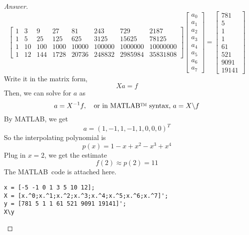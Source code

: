 \begin{proof}[Answer]
\[\begin{bmatrix}
1 &	3	&	9	&	27		&	81		&	243		&	729		&	2187	\\
1 &	5	&	25	&	125		&	625		&	3125	&	15625	&	78125	\\
1 &	10	&	100	&	1000	&	10000	&	100000	&	1000000	&	10000000\\
1 &	12	&	144	&	1728	&	20736	&	248832	&	2985984	&	35831808
\end{bmatrix}
\begin{bmatrix}
a_0 \\ a_1 \\ a_2 \\ a_3 \\ a_4 \\ a_5 \\ a_6 \\ a_7
\end{bmatrix}=
\begin{bmatrix}
781 \\ 5 \\ 1 \\ 1 \\ 61 \\ 521 \\ 9091 \\ 19141
\end{bmatrix}\]
Write it in the matrix form,
\[ Xa=f \]
Then, we can solve for $a$ as
\[ a=X^{-1}f, \quad \textrm{or in MATLAB\texttrademark\ syntax, } a=X\backslash f \]
By MATLAB\texttrademark, we get
\[ a=(1,-1,1,-1,1,0,0,0)^T \]
So the interpolating polynomial is
\[ p(x)=1-x+x^2-x^3+x^4 \]
Plug in $x=2$, we get the estimate
\[ f(2) \approx p(2) = 11 \]
The MATLAB\texttrademark\ code is attached here.
\begin{lstlisting}[style=Matlab-editor]
x = [-5 -1 0 1 3 5 10 12];
X = [x.^0;x.^1;x.^2;x.^3;x.^4;x.^5;x.^6;x.^7]';
y = [781 5 1 1 61 521 9091 19141]';
X\y
\end{lstlisting}
\end{proof}


